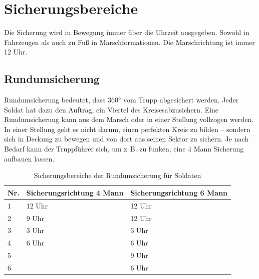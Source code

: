 \pagebreak

\section{Sicherungsbereiche}
Die Sicherung wird in Bewegung immer über die Uhrzeit ausgegeben. Sowohl in Fahrzeugen als auch zu Fuß in Marschformationen. Die Marschrichtung ist immer 12 Uhr.

\subsection{Rundumsicherung}
Rundumsicherung bedeutet, dass 360° vom Trupp abgesichert werden. Jeder Soldat hat dazu den Auftrag, ein Viertel des \glqq Kreises\grqq\space abzusichern. Eine Rundumsicherung kann aus dem Marsch oder in einer Stellung vollzogen werden. In einer Stellung geht es nicht darum, einen perfekten Kreis zu bilden -- sondern sich in Deckung zu bewegen und von dort aus seinen Sektor zu sichern. Je nach Bedarf kann der Truppführer sich, um z.\,B. zu funken, eine 4 Mann Sicherung aufbauen lassen.
\begin{table}[h]	
	\caption{Sicherungsbereiche der Rundumsicherung für Soldaten}
	\vspace{2.5mm}
	\label{tab:360er}
	\centering
	\begin{tabular}{lll}
		\toprule
		Nr. & Sicherungsrichtung 4 Mann & Sicherungsrichtung 6 Mann\\
		\midrule
		1 & 12 Uhr 	& 12 Uhr\\
		2 & 9 Uhr	& 12 Uhr\\
		3 & 3 Uhr	& 3 Uhr\\
		4 & 6 Uhr	& 6 Uhr\\
		5 &			& 9 Uhr\\
		6 &			& 6 Uhr\\
		\bottomrule
	 \end{tabular}
\end{table}
		
\begin{figure}[h]
	\centering
	\label{fig:360er}
\end{figure}

